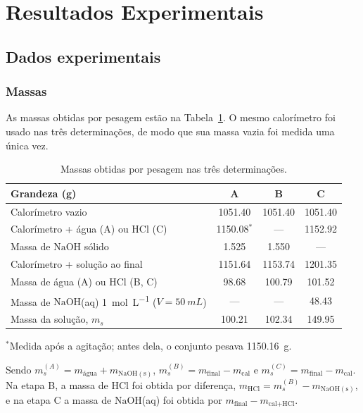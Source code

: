 \section{Resultados Experimentais}

\subsection{Dados experimentais}

\subsubsection{Massas}

As massas obtidas por pesagem estão na Tabela~\ref{tab:massas}. O mesmo calorímetro foi usado nas três determinações, de modo que sua massa vazia foi medida uma única vez.

\begin{table}[H]
\centering
\caption{Massas obtidas por pesagem nas três determinações.}
\label{tab:massas}
\begin{tabular}{lccc}
\toprule
\textbf{Grandeza (g)} & \textbf{A} & \textbf{B} & \textbf{C}\\
\midrule
Calorímetro vazio & \num{1051,40} & \num{1051,40} & \num{1051,40}\\
Calorímetro + água (A) ou $\mathrm{HCl}$ (C) & \num{1150,08}$^{*}$ & --- & \num{1152,92}\\
Massa de $\mathrm{NaOH}$ sólido & \num{1,525} & \num{1,550} & ---\\
Calorímetro + solução ao final & \num{1151,64} & \num{1153,74} & \num{1201,35}\\
\midrule
Massa de água (A) ou $\mathrm{HCl}$ (B, C) & \num{98,68} & \num{100,79} & \num{101,52}\\
Massa de $\mathrm{NaOH}$(aq) \SI{1}{mol.L^{-1}} ($V=\SI{50}{mL}$) & --- & --- & \num{48,43}\\
\midrule
Massa da solução, $m_s$ & \num{100,21} & \num{102,34} & \num{149,95}\\
\bottomrule
\end{tabular}

\vspace{2pt}
{\footnotesize $^{*}$Medida após a agitação; antes dela, o conjunto pesava \SI{1150,16}{g}.}
\end{table}

Sendo $m_s^{(A)} = m_{\text{água}} + m_{\mathrm{NaOH(s)}}$, $m_s^{(B)} = m_{\text{final}} - m_{\text{cal}}$ e $m_s^{(C)} = m_{\text{final}} - m_{\text{cal}}$. Na etapa B, a massa de $\mathrm{HCl}$ foi obtida por diferença, $m_{\mathrm{HCl}} = m_s^{(B)} - m_{\mathrm{NaOH(s)}}$, e na etapa C a massa de $\mathrm{NaOH}$(aq) foi obtida por $m_{\text{final}} - m_{\text{cal+HCl}}$.


